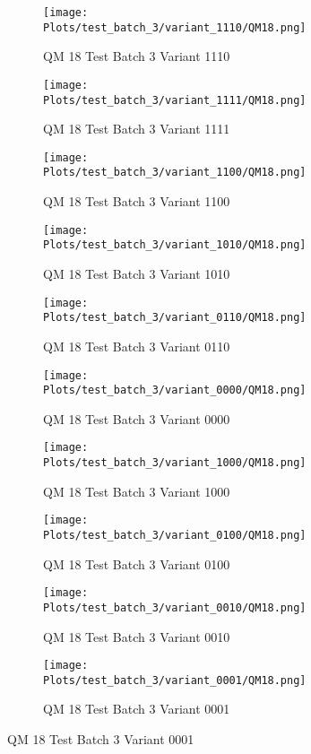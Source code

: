 \documentclass{DissertateFigs}
\begin{document}
\begin{figure}[t!]
    \begin{subfigure}{0.47\textwidth}
    \texttt{[image: Plots/test\_batch\_3/variant\_1110/QM18.png]}
    \caption{QM 18 Test Batch 3 Variant 1110}
    \end{subfigure}
    \begin{subfigure}{0.47\textwidth}
    \texttt{[image: Plots/test\_batch\_3/variant\_1111/QM18.png]}
    \caption{QM 18 Test Batch 3 Variant 1111}
    \end{subfigure}

\medskip

    \begin{subfigure}{0.47\textwidth}
    \texttt{[image: Plots/test\_batch\_3/variant\_1100/QM18.png]}
    \caption{QM 18 Test Batch 3 Variant 1100}
    \end{subfigure}
    \begin{subfigure}{0.47\textwidth}
    \texttt{[image: Plots/test\_batch\_3/variant\_1010/QM18.png]}
    \caption{QM 18 Test Batch 3 Variant 1010}
    \end{subfigure}

\medskip

    \begin{subfigure}{0.47\textwidth}
    \texttt{[image: Plots/test\_batch\_3/variant\_0110/QM18.png]}
    \caption{QM 18 Test Batch 3 Variant 0110}
    \end{subfigure}
    \begin{subfigure}{0.47\textwidth}
    \texttt{[image: Plots/test\_batch\_3/variant\_0000/QM18.png]}
    \caption{QM 18 Test Batch 3 Variant 0000}
    \end{subfigure}

\medskip

    \begin{subfigure}{0.47\textwidth}
    \texttt{[image: Plots/test\_batch\_3/variant\_1000/QM18.png]}
    \caption{QM 18 Test Batch 3 Variant 1000}
    \end{subfigure}
    \begin{subfigure}{0.47\textwidth}
    \texttt{[image: Plots/test\_batch\_3/variant\_0100/QM18.png]}
    \caption{QM 18 Test Batch 3 Variant 0100}
    \end{subfigure}

\medskip

    \begin{subfigure}{0.47\textwidth}
    \texttt{[image: Plots/test\_batch\_3/variant\_0010/QM18.png]}
    \caption{QM 18 Test Batch 3 Variant 0010}
    \end{subfigure}
    \begin{subfigure}{0.47\textwidth}
    \texttt{[image: Plots/test\_batch\_3/variant\_0001/QM18.png]}
    \caption{QM 18 Test Batch 3 Variant 0001}
    \end{subfigure}


\end{figure}
\end{document}
